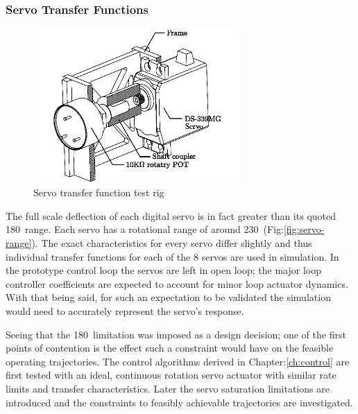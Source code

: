 \subsubsection*{Servo Transfer Functions}
\begin{figure}[htbp]
\centering
\includegraphics[width=0.7\textwidth]{figs/servo-position}
\caption{Servo transfer function test rig}
\label{fig:servo-position}
\end{figure}
The full scale deflection of each digital servo is in fact greater than its quoted 180\textdegree ~range. Each servo has a rotational range of around 230\textdegree ~(Fig:\ref{fig:servo-range}). The exact characteristics for every servo differ slightly and thus individual transfer functions for each of the 8 servos are used in simulation. In the prototype control loop the servos are left in open loop; the major loop controller coefficients are expected to account for minor loop actuator dynamics. With that being said, for such an expectation to be validated the simulation would need to accurately represent the servo's response. 
\par
Seeing that the 180\textdegree ~limitation was imposed as a design decision; one of the first points of contention is the effect such a constraint would have on the feasible operating trajectories. The control algorithms derived in Chapter:\ref{ch:control} are first tested with an ideal, continuous rotation servo actuator with similar rate limits and transfer characteristics. Later the servo saturation limitations are introduced and the constraints to feasibly achievable trajectories are investigated.
